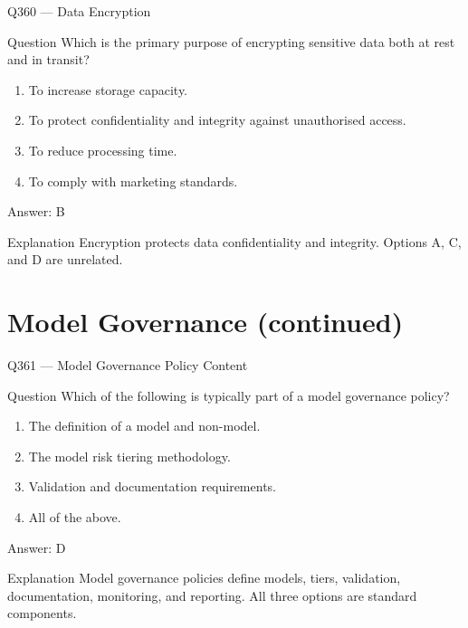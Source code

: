 \documentclass[aspectratio=169,8pt]{beamer}
\begin{document}
	
	\begin{frame}{Q360 --- Data Encryption}
		\begin{block}{Question}
			Which is the primary purpose of encrypting sensitive data both at rest and in transit?
			\begin{enumerate}
				\item To increase storage capacity.
				\item To protect confidentiality and integrity against unauthorised access.
				\item To reduce processing time.
				\item To comply with marketing standards.
			\end{enumerate}
		\end{block}
		\begin{exampleblock}{Answer: B}\end{exampleblock}
		\begin{block}{Explanation}
			Encryption protects data confidentiality and integrity. Options A, C, and D are unrelated.
		\end{block}
	\end{frame}
	
	\section{Model Governance (continued)}
	
	\begin{frame}{Q361 --- Model Governance Policy Content}
		\begin{block}{Question}
			Which of the following is typically part of a model governance policy?
			\begin{enumerate}
				\item The definition of a model and non-model.
				\item The model risk tiering methodology.
				\item Validation and documentation requirements.
				\item All of the above.
			\end{enumerate}
		\end{block}
		\begin{exampleblock}{Answer: D}\end{exampleblock}
		\begin{block}{Explanation}
			Model governance policies define models, tiers, validation, documentation, monitoring, and reporting. All three options are standard components.
		\end{block}
	\end{frame}
\end{document}
